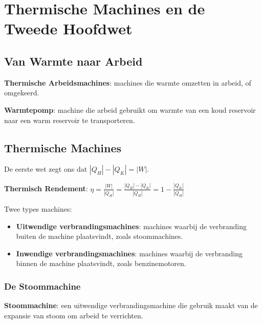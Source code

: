 \section{Thermische Machines en de Tweede Hoofdwet}
\subsection{Van Warmte naar Arbeid}

\begin{definition}
    \textbf{Thermische Arbeidsmachines}: machines die warmte omzetten in arbeid, of omgekeerd.
\end{definition}
\begin{definition}
    \textbf{Warmtepomp}: machine die arbeid gebruikt om warmte van een koud reservoir naar een warm reservoir te transporteren.
\end{definition}

\subsection{Thermische Machines}

De eerste wet zegt ons dat \(|Q_H| - |Q_K| = |W|\).

\begin{definition}
    \textbf{Thermisch Rendement}: \(\eta = \frac{|W|}{|Q_H|} = \frac{|Q_H| - |Q_K|}{|Q_H|} = 1 - \frac{|Q_K|}{|Q_H|}\)
\end{definition}

Twee types machines:
\begin{itemize}
    \item \textbf{Uitwendige verbrandingsmachines}: machines waarbij de verbranding buiten de machine plaatsvindt, zoals stoommachines.
    \item \textbf{Inwendige verbrandingsmachines}: machines waarbij de verbranding binnen de machine plaatsvindt, zoals benzinemotoren.
\end{itemize}

\subsubsection{De Stoommachine}

\begin{definition}
    \textbf{Stoommachine}: een uitwendige verbrandingsmachine die gebruik maakt van de expansie van stoom om arbeid te verrichten.
\end{definition}    


